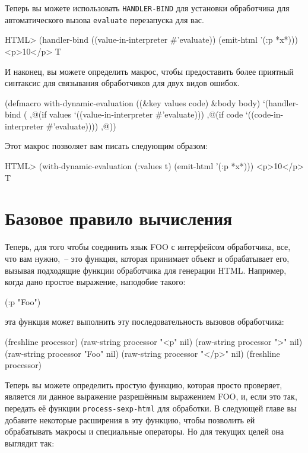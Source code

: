 Теперь вы можете использовать \lstinline{HANDLER-BIND} для установки обработчика для
автоматического вызова \lstinline{evaluate} перезапуска для вас.

\begin{myverb}
HTML> (handler-bind ((value-in-interpreter \#{}'evaluate)) (emit-html '(:p *x*)))
<p>10</p>
T
\end{myverb}

И наконец, вы можете определить макрос, чтобы предоставить более приятный синтаксис для
связывания обработчиков для двух видов ошибок.

\begin{myverb}
(defmacro with-dynamic-evaluation ((\&{}key values code) \&{}body body)
  `(handler-bind (
       ,@(if values `((value-in-interpreter \#{}'evaluate)))
       ,@(if code `((code-in-interpreter \#'evaluate))))
     ,@))
\end{myverb}

Этот макрос позволяет вам писать следующим образом: 

\begin{myverb}
HTML> (with-dynamic-evaluation (:values t) (emit-html '(:p *x*)))
<p>10</p>
T
\end{myverb}

\normalsize

\section{Базовое правило вычисления}

Теперь, для того чтобы соединить язык FOO с интерфейсом обработчика, все, что вам
нужно,~-- это функция, которая принимает объект и обрабатывает его, вызывая подходящие
функции обработчика для генерации HTML. Например, когда дано простое выражение, наподобие
такого:

\begin{myverb}
(:p "Foo")
\end{myverb}

\noindent{}эта функция может выполнить эту последовательность вызовов обработчика:

\begin{myverb}
(freshline processor)
(raw-string processor "<p" nil)
(raw-string processor ">" nil)
(raw-string processor "Foo" nil)
(raw-string processor "</p>" nil)
(freshline processor)
\end{myverb}

Теперь вы можете определить простую функцию, которая просто проверяет, является ли данное
выражение разрешённым выражением FOO, и, если это так, передать её функции
\lstinline{process-sexp-html} для обработки. В следующей главе вы добавите некоторые расширения
в эту функцию, чтобы позволить ей обрабатывать макросы и специальные операторы. Но для
текущих целей она выглядит так:

